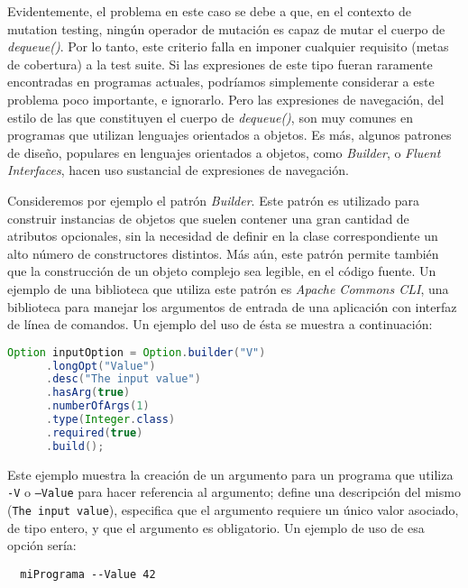 Evidentemente, el problema en este caso se debe a que, en el contexto de mutation testing, ning\'un operador de mutaci\'on es capaz de mutar el cuerpo de \emph{dequeue()}. Por lo tanto, este criterio falla en imponer cualquier requisito (metas de cobertura) a la test suite. Si las expresiones de este tipo fueran raramente encontradas en programas actuales, podr\'iamos simplemente considerar a este problema poco importante, e ignorarlo. Pero las expresiones de navegaci\'on, del estilo de las que constituyen el cuerpo de \emph{dequeue()}, son muy comunes en programas que utilizan lenguajes orientados a objetos. Es m\'as, algunos patrones de dise\~no, populares en lenguajes orientados a objetos, como \emph{Builder}, o \emph{Fluent Interfaces}, hacen uso sustancial de expresiones de navegaci\'on.

Consideremos por ejemplo el patr\'on \emph{Builder}. Este patr\'on es utilizado para construir instancias de objetos que suelen contener una gran cantidad de atributos opcionales, sin la necesidad de definir en la clase correspondiente un alto n\'umero de constructores distintos. M\'as a\'un, este patr\'on permite tambi\'en que la construcci\'on de un objeto complejo sea legible, en el c\'odigo fuente. Un ejemplo de una biblioteca que utiliza este patr\'on es \emph{Apache Commons CLI}, una biblioteca para manejar los argumentos de entrada de una aplicaci\'on con interfaz de l\'inea de comandos. Un ejemplo del uso de \'esta se muestra a continuaci\'on:
\begin{center}
	\begin{lstlisting}[mathescape=true, language=Java,showstringspaces=false]
    Option inputOption = Option.builder("V")
      .longOpt("Value")
      .desc("The input value")
      .hasArg(true)
      .numberOfArgs(1)
      .type(Integer.class)
      .required(true)
      .build();
	\end{lstlisting}
\end{center}
Este ejemplo muestra la creaci\'on de un argumento para un programa que utiliza \texttt{-V} o \texttt{--Value} para hacer referencia al argumento; define una descripci\'on del mismo (\texttt{The input value}), especifica que el argumento requiere un \'unico valor asociado, de tipo entero, y que el argumento es obligatorio. Un ejemplo de uso de esa opci\'on ser\'ia:
\begin{lstlisting}
  miPrograma --Value 42
\end{lstlisting}

